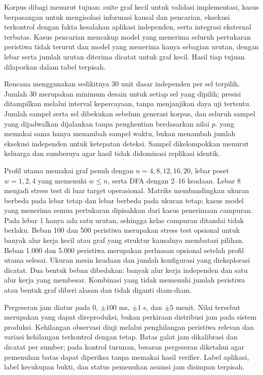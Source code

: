 Korpus dibagi menurut tujuan: suite graf kecil untuk validasi implementasi, kasus berpasangan untuk mengisolasi informasi kausal dan pencarian, eksekusi terkontrol dengan fakta kesalahan aplikasi independen, serta integrasi eksternal terbatas. Kasus pencarian mencakup model yang menerima seluruh pertukaran peristiwa tidak terurut dan model yang menerima hanya sebagian urutan, dengan lebar serta jumlah urutan diterima dicatat untuk graf kecil. Hasil tiap tujuan dilaporkan dalam tabel terpisah.

Rencana menggunakan sedikitnya 30 unit dasar independen per sel terpilih. Jumlah 30 merupakan minimum desain untuk setiap sel yang dipilih; presisi ditampilkan melalui interval kepercayaan, tanpa menjanjikan daya uji tertentu. Jumlah sampel serta sel dibekukan sebelum generasi korpus, dan seluruh sampel yang dijadwalkan dijalankan tanpa penghentian berdasarkan nilai $p$.  yang memakai  sama hanya menambah sampel waktu, bukan menambah jumlah eksekusi independen untuk ketepatan deteksi. Sampel dikelompokkan menurut keluarga dan sumbernya agar hasil tidak didominasi replikasi identik.

Profil utama memakai graf penuh dengan $n=4,8,12,16,20$, lebar poset $w=1,2,4$ yang memenuhi $w\leq n$, serta DFA dengan 2--16 keadaan. Lebar 8 menjadi stress test di luar target operasional. Matriks membandingkan ukuran berbeda pada lebar tetap dan lebar berbeda pada ukuran tetap; kasus model yang menerima semua pertukaran dipisahkan dari kasus penerimaan campuran. Pada lebar 1 hanya ada satu urutan, sehingga kelas campuran ditandai tidak berlaku. Beban 100 dan 500 peristiwa merupakan stress test opsional untuk banyak alur kerja kecil atau graf yang struktur kausalnya membatasi pilihan. Beban 1.000 dan 5.000 peristiwa merupakan perluasan opsional setelah profil utama selesai. Ukuran mesin keadaan dan jumlah konfigurasi yang dieksplorasi dicatat. Dua bentuk beban dibedakan: banyak alur kerja independen dan satu alur kerja yang membesar. Kombinasi yang tidak memenuhi jumlah peristiwa atau bentuk graf diberi alasan dan tidak diganti diam-diam.

Pergeseran jam diatur pada 0, $\pm100$ ms, $\pm1$ s, dan $\pm5$ menit. Nilai tersebut merupakan  yang dapat direproduksi, bukan perkiraan distribusi jam pada sistem produksi. Kehilangan observasi diuji melalui penghilangan peristiwa relevan dan variasi kehilangan terkontrol dengan  tetap. Batas galat jam dikalibrasi dan dicatat per sumber; pada kontrol turunan, besaran pergeseran diketahui agar pemenuhan batas dapat diperiksa tanpa memakai hasil verifier. Label aplikasi, label kecukupan bukti, dan status pemenuhan asumsi jam disimpan terpisah.

